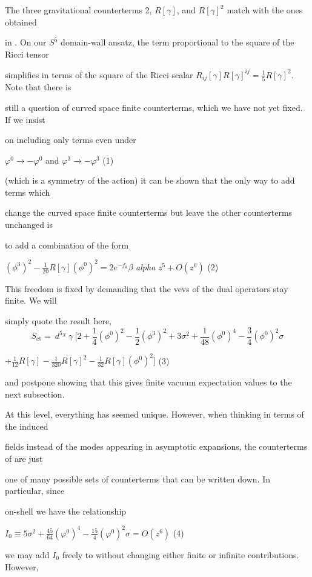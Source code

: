 \documentclass[a4paper,12pt]{article}
\begin{document}
The three gravitational counterterms 2, $R[\gamma]$, and $R[\gamma]^{2}$ match with the ones obtained

in . On our $S^{5}$ domain-wall ansatz, the term proportional to the square of the Ricci tensor

simplifies in terms of the square of the Ricci scalar $R_{ij}[\displaystyle \gamma]R[\gamma]^{ij}=\frac{1}{5}R[\gamma]^{2}$. Note that there is

still a question of curved space finite counterterms, which we have not yet fixed. If we insist

on including only terms even under
\begin{center}
$\varphi^{0}\rightarrow-\varphi^{0}$ and $\varphi^{3}\rightarrow-\varphi^{3}$   (1)
\end{center}
(which is a symmetry of the action) it can be shown that the only way to add terms which

change the curved space finite counterterms but leave the other counterterms unchanged is

to add a combination of the form
\begin{center}
$(\displaystyle \phi^{3})^{2}-\frac{1}{20}R[\gamma](\phi^{0})^{2}=2e^{-f_{k}}\beta$ {\it alpha} $z^{5}+O(z^{6})$   (2)
\end{center}
This freedom is fixed by demanding that the vevs of the dual operators stay finite. We will

simply quote the result here,
$$
 S_{\mathrm{c}\mathrm{t}}=\ d^{5_{X}}\ \gamma\ [2+\frac{1}{4}(\phi^{0})^{2}-\frac{1}{2}(\phi^{3})^{2}+3\sigma^{2}+\frac{1}{48}(\phi^{0})^{4}-\frac{3}{4}(\phi^{0})^{2}\sigma
$$
\begin{center}
$+\displaystyle \frac{1}{12}R[\gamma]-\frac{1}{320}R[\gamma]^{2}-\frac{1}{32}R[\gamma](\phi^{0})^{2}]$   (3)
\end{center}
and postpone showing that this gives finite vacuum expectation values to the next subsection.

At this level, everything has seemed unique. However, when thinking in terms of the induced

fields instead of the modes appearing in asymptotic expansions, the counterterms of are just

one of many possible sets of counterterms that can be written down. In particular, since

on-shell we have the relationship
\begin{center}
$I_{0}\displaystyle \equiv 5\sigma^{2}+\frac{45}{64}(\varphi^{0})^{4}-\frac{15}{4}(\varphi^{0})^{2}\sigma=O(z^{6})$   (4)
\end{center}
we may add $I_{0}$ freely to without changing either finite or infinite contributions. However,
\end{document}
